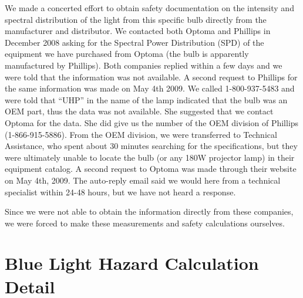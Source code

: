 \documentclass[10pt]{article}
\begin{document}
We made a concerted effort to obtain safety documentation on the
intensity and spectral distribution of the light from this specific
bulb directly from the manufacturer and distributor.  We contacted
both Optoma and Phillips in December 2008 asking for the Spectral
Power Distribution (SPD) of the equipment we have purchased from
Optoma (the bulb is apparently manufactured by Phillips).  Both
companies replied within a few days and we were told that the
information was not available.  A second request to Phillips for the
same information was made on May 4th 2009.  We called 1-800-937-5483
and were told that ``UHP'' in the name of the lamp indicated that the
bulb was an OEM part, thus the data was not available.  She suggested
that we contact Optoma for the data.  She did give us the number of
the OEM division of Phillips (1-866-915-5886).  From the OEM division,
we were transferred to Technical Assistance, who spent about 30
minutes searching for the specifications, but they were ultimately
unable to locate the bulb (or any 180W projector lamp) in their
equipment catalog.
%
A second request to Optoma was made through their website on May 4th,
2009.  The auto-reply email said we would here from a technical
specialist within 24-48 hours, but we have not heard a response.  

Since we were not able to obtain the information directly from these
companies, we were forced to make these measurements and safety
calculations ourselves.  




\section{Blue Light Hazard Calculation Detail}
\end{document}
